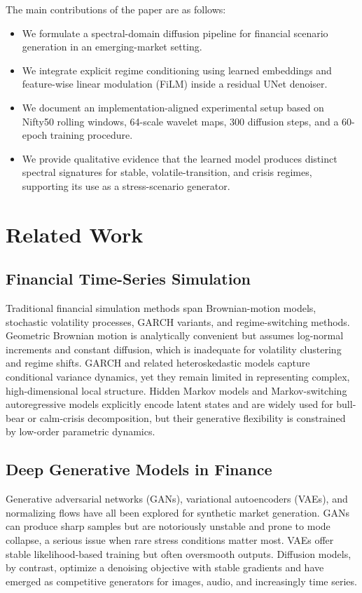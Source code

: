 \documentclass[conference]{IEEEtran}
\begin{document}
The main contributions of the paper are as follows:
\begin{itemize}
    \item We formulate a spectral-domain diffusion pipeline for financial scenario generation in an emerging-market setting.
    \item We integrate explicit regime conditioning using learned embeddings and feature-wise linear modulation (FiLM) inside a residual UNet denoiser.
    \item We document an implementation-aligned experimental setup based on Nifty50 rolling windows, 64-scale wavelet maps, 300 diffusion steps, and a 60-epoch training procedure.
    \item We provide qualitative evidence that the learned model produces distinct spectral signatures for stable, volatile-transition, and crisis regimes, supporting its use as a stress-scenario generator.
\end{itemize}

\section{Related Work}
\subsection{Financial Time-Series Simulation}
Traditional financial simulation methods span Brownian-motion models, stochastic volatility processes, GARCH variants, and regime-switching methods. Geometric Brownian motion is analytically convenient but assumes log-normal increments and constant diffusion, which is inadequate for volatility clustering and regime shifts. GARCH and related heteroskedastic models capture conditional variance dynamics, yet they remain limited in representing complex, high-dimensional local structure. Hidden Markov models and Markov-switching autoregressive models explicitly encode latent states and are widely used for bull-bear or calm-crisis decomposition, but their generative flexibility is constrained by low-order parametric dynamics.

\subsection{Deep Generative Models in Finance}
Generative adversarial networks (GANs), variational autoencoders (VAEs), and normalizing flows have all been explored for synthetic market generation. GANs can produce sharp samples but are notoriously unstable and prone to mode collapse, a serious issue when rare stress conditions matter most. VAEs offer stable likelihood-based training but often oversmooth outputs. Diffusion models, by contrast, optimize a denoising objective with stable gradients and have emerged as competitive generators for images, audio, and increasingly time series.
\end{document}
